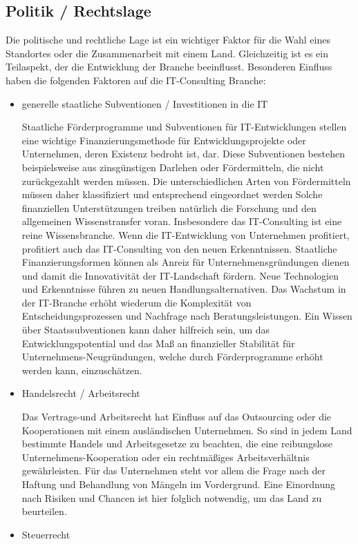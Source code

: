  \subsection*{Politik / Rechtslage}
Die politische und rechtliche Lage ist ein wichtiger Faktor für die Wahl eines Standortes oder die Zusammenarbeit mit einem Land. Gleichzeitig ist es ein Teilaspekt, der die Entwicklung der Branche beeinflusst.
Besonderen Einfluss haben die folgenden Faktoren auf die IT-Consulting Branche:
\begin{itemize} 
\item {generelle staatliche Subventionen / Investitionen in die IT}

 Staatliche Förderprogramme und Subventionen für IT-Entwicklungen stellen eine wichtige Finanzierungsmethode für Entwicklungsprojekte oder Unternehmen, deren Existenz bedroht ist, dar. Diese Subventionen bestehen beispielsweise aus zinsgünstigen Darlehen oder Fördermitteln, die nicht zurückgezahlt werden müssen. Die unterschiedlichen Arten von Fördermitteln müssen daher klassifiziert und entsprechend eingeordnet werden
 Solche finanziellen Unterstützungen treiben natürlich die Forschung und den allgemeinen Wissenstransfer voran. Insbesondere das IT-Consulting ist eine reine Wissensbranche. Wenn die IT-Entwicklung von Unternehmen profitiert, profitiert auch das IT-Consulting von den neuen Erkenntnissen. 
 Staatliche Finanzierungsformen können als Anreiz für Unternehmensgründungen dienen und damit die Innovativität der IT-Landschaft fördern. Neue Technologien und Erkenntnisse führen zu neuen Handlungsalternativen. Das Wachstum in der IT-Branche erhöht wiederum die Komplexität von Entscheidungsprozessen und Nachfrage nach Beratungsleistungen.
Ein Wissen über Staatssubventionen kann daher hilfreich sein, um das Entwicklungspotential und das Maß an finanzieller Stabilität für Unternehmens-Neugründungen, welche durch Förderprogramme erhöht werden kann, einzuschätzen.
 \\
\item  {Handelsrecht / Arbeitsrecht}

 Das Vertrags-und Arbeitsrecht hat Einfluss auf das Outsourcing oder die Kooperationen mit einem ausländischen Unternehmen. 
 So sind in jedem Land bestimmte Handels und Arbeitsgesetze zu beachten, die eine reibungslose Unternehmens-Kooperation oder ein rechtmäßiges Arbeitsverhältnis gewährleisten. 
Für das Unternehmen steht vor allem die Frage nach der Haftung und Behandlung von Mängeln im Vordergrund. 
Eine Einordnung nach Risiken und Chancen ist hier folglich notwendig, um das Land zu beurteilen. 
 \\
\item {Steuerrecht}


\end{itemize}
